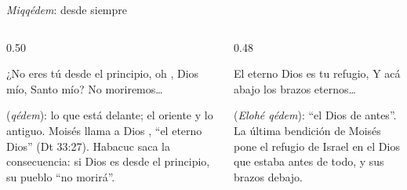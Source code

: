 \begin{frame}{\emph{Miqqédem}: desde siempre}
\begin{columns}[t,onlytextwidth]
\begin{column}{0.50\textwidth}
\begin{center}\end{center}
\begin{cita}¿No eres tú desde el principio, oh \SENOR, Dios mío, Santo mío? No moriremos\ldots{}\end{cita}
\scriptsize {} (\emph{qédem}): lo que está delante; el oriente y lo antiguo. Moisés llama a Dios , ``el eterno Dios'' (Dt 33:27). Habacuc saca la consecuencia: si Dios es desde el principio, su pueblo ``no morirá''.
\end{column}
\begin{column}{0.48\textwidth}
\begin{center}\end{center}
\begin{cita}El eterno Dios es tu refugio, Y acá abajo los brazos eternos\ldots{}\end{cita}
\scriptsize {} (\emph{Elohé qédem}): ``el Dios de antes''. La última bendición de Moisés pone el refugio de Israel en el Dios que estaba antes de todo, y sus brazos debajo.
\end{column}
\end{columns}
\end{frame}

